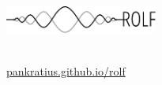 \documentclass[a4paper]{article}
\begin{document}
	\vspace*{-1cm}
	\parbox{4cm}{\vspace{-0.2cm}\includegraphics[width=5cm]{../images/logo_scaled.pdf}}
	\parbox{12.5cm}{ \\
			\url{pankratius.github.io/rolf} \\ \vspace*{-.5cm} }
		\vspace{0.5cm}

\thispagestyle{empty}

\noindent





\end{document}
